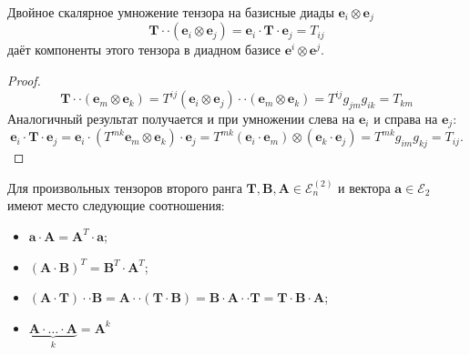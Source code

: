 \begin{utv}
	Двойное скалярное умножение тензора на базисные диады $\mathbf{e}_i\otimes\mathbf{e}_j$
\begin{equation*}
	\mathbf{T}\cdot\cdot\left(\mathbf{e}_i\otimes\mathbf{e}_j\right)=\mathbf{e}_i\cdot\mathbf{T}\cdot\mathbf{e}_j = T_{ij}
\end{equation*}
даёт компоненты этого тензора в диадном базисе $\mathbf{e}^i\otimes\mathbf{e}^j$.
\begin{proof}
	\begin{equation*}
		\mathbf{T}\cdot\cdot\left(\mathbf{e}_m\otimes\mathbf{e}_k\right)= T^{ij}\left(\mathbf{e}_i\otimes\mathbf{e}_j\right)\cdot\cdot\left(\mathbf{e}_m\otimes\mathbf{e}_k\right)=T^{ij}g_{jm}g_{ik}=T_{km}
	\end{equation*}
	Аналогичный результат получается и при умножении слева на $\mathbf{e}_i$ и справа на $\mathbf{e}_j$:
	\begin{equation*}
		\mathbf{e}_i\cdot\mathbf{T}\cdot\mathbf{e}_j = \mathbf{e}_i\cdot\left(T^{mk}\mathbf{e}_m\otimes\mathbf{e}_k\right)\cdot\mathbf{e}_j=
		T^{mk}\left(\mathbf{e}_i\cdot\mathbf{e}_m\right)\otimes\left(\mathbf{e}_k\cdot\mathbf{e}_j\right)=
		T^{mk}g_{im}g_{kj}=T_{ij}.
	\end{equation*}
\end{proof}
\end{utv}
\begin{utv}
	Для произвольных тензоров второго ранга $\mathbf{T},\mathbf{B},\mathbf{A}\in\mathcal{E}_n^{(2)}$ и вектора $\mathbf{a}\in\mathcal{E}_2$ имеют место следующие соотношения:
	\begin{itemize}
		\item $\mathbf{a}\cdot\mathbf{A}=\mathbf{A}^T\cdot\mathbf{a}$;
		\item $\left(\mathbf{A}\cdot\mathbf{B}\right)^T=\mathbf{B}^T\cdot\mathbf{A}^T$;
		\item $\left(\mathbf{A}\cdot\mathbf{T}\right)\cdot\cdot\mathbf{B}=\mathbf{A}\cdot\cdot\left(\mathbf{T}\cdot\mathbf{B}\right)=\mathbf{B}\cdot\mathbf{A}\cdot\cdot\mathbf{T}=\mathbf{T}\cdot\mathbf{B}\cdot\mathbf{A}$;
		\item $\underbrace{\mathbf{A}\cdot\dots\cdot\mathbf{A}}_{k}=\mathbf{A}^k$
	\end{itemize}
\end{utv}

